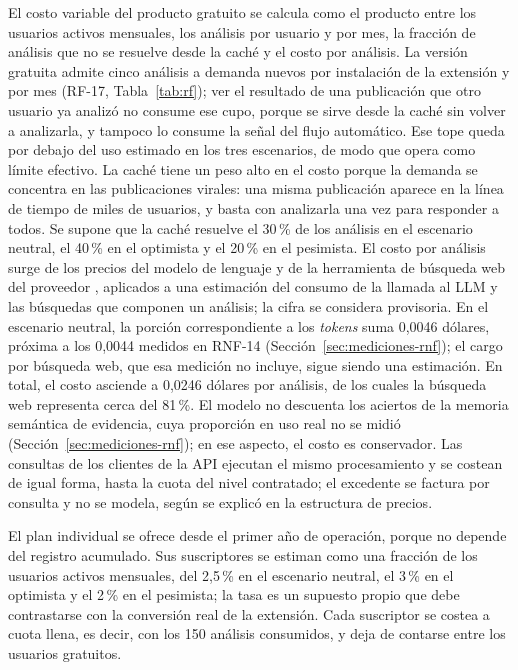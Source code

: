 El costo variable del producto gratuito se calcula como el producto entre los usuarios activos mensuales, los análisis por usuario y por mes, la fracción de análisis que no se resuelve desde la caché y el costo por análisis. La versión gratuita admite cinco análisis a demanda nuevos por instalación de la extensión y por mes (RF-17, Tabla~\ref{tab:rf}); ver el resultado de una publicación que otro usuario ya analizó no consume ese cupo, porque se sirve desde la caché sin volver a analizarla, y tampoco lo consume la señal del flujo automático. Ese tope queda por debajo del uso estimado en los tres escenarios, de modo que opera como límite efectivo. La caché tiene un peso alto en el costo porque la demanda se concentra en las publicaciones virales: una misma publicación aparece en la línea de tiempo de miles de usuarios, y basta con analizarla una vez para responder a todos. Se supone que la caché resuelve el 30\,\% de los análisis en el escenario neutral, el 40\,\% en el optimista y el 20\,\% en el pesimista. El costo por análisis surge de los precios del modelo de lenguaje y de la herramienta de búsqueda web del proveedor \parencite{OpenAI2026}, aplicados a una estimación del consumo de la llamada al LLM y las búsquedas que componen un análisis; la cifra se considera provisoria. En el escenario neutral, la porción correspondiente a los \textit{tokens} suma 0,0046 dólares, próxima a los 0,0044 medidos en RNF-14 (Sección~\ref{sec:mediciones-rnf}); el cargo por búsqueda web, que esa medición no incluye, sigue siendo una estimación. En total, el costo asciende a 0,0246 dólares por análisis, de los cuales la búsqueda web representa cerca del 81\,\%. El modelo no descuenta los aciertos de la memoria semántica de evidencia, cuya proporción en uso real no se midió (Sección~\ref{sec:mediciones-rnf}); en ese aspecto, el costo es conservador. Las consultas de los clientes de la API ejecutan el mismo procesamiento y se costean de igual forma, hasta la cuota del nivel contratado; el excedente se factura por consulta y no se modela, según se explicó en la estructura de precios.

El plan individual se ofrece desde el primer año de operación, porque no depende del registro acumulado. Sus suscriptores se estiman como una fracción de los usuarios activos mensuales, del 2,5\,\% en el escenario neutral, el 3\,\% en el optimista y el 2\,\% en el pesimista; la tasa es un supuesto propio que debe contrastarse con la conversión real de la extensión. Cada suscriptor se costea a cuota llena, es decir, con los 150 análisis consumidos, y deja de contarse entre los usuarios gratuitos.

